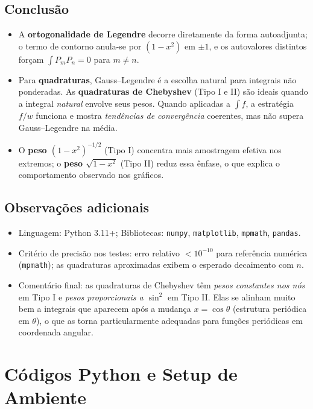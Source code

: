 \documentclass[12pt,a4paper]{article}
\begin{document}
\subsection{Conclusão}
\begin{itemize}
  \item A \textbf{ortogonalidade de Legendre} decorre diretamente da forma autoadjunta; o termo de contorno anula-se por \((1-x^2)\) em \(\pm1\), e os autovalores distintos forçam \(\int P_mP_n=0\) para \(m\neq n\).
  \item Para \textbf{quadraturas}, Gauss–Legendre é a escolha natural para integrais não ponderadas. As \textbf{quadraturas de Chebyshev} (Tipo I e II) são ideais quando a integral \emph{natural} envolve seus pesos. Quando aplicadas a \(\int f\), a estratégia \(f/w\) funciona e mostra \emph{tendências de convergência} coerentes, mas não supera Gauss–Legendre na média.
  \item O \textbf{peso \((1-x^2)^{-1/2}\)} (Tipo I) concentra mais amostragem efetiva nos extremos; o \textbf{peso \(\sqrt{1-x^2}\)} (Tipo II) reduz essa ênfase, o que explica o comportamento observado nos gráficos.
\end{itemize}

\subsection{Observações adicionais}
\begin{itemize}
  \item Linguagem: Python 3.11+; Bibliotecas: \texttt{numpy}, \texttt{matplotlib}, \texttt{mpmath}, \texttt{pandas}.
  \item Critério de precisão nos testes: erro relativo \(<10^{-10}\) para referência numérica (\texttt{mpmath}); as quadraturas aproximadas exibem o esperado decaimento com \(n\).
  \item Comentário final: as quadraturas de Chebyshev têm \emph{pesos constantes nos nós} em Tipo I e \emph{pesos proporcionais a \(\sin^2\)} em Tipo II. Elas se alinham muito bem a integrais que aparecem após a mudança \(x=\cos\theta\) (estrutura periódica em \(\theta\)), o que as torna particularmente adequadas para funções periódicas em coordenada angular.
\end{itemize}


\section{Códigos Python e Setup de Ambiente}
\end{document}
